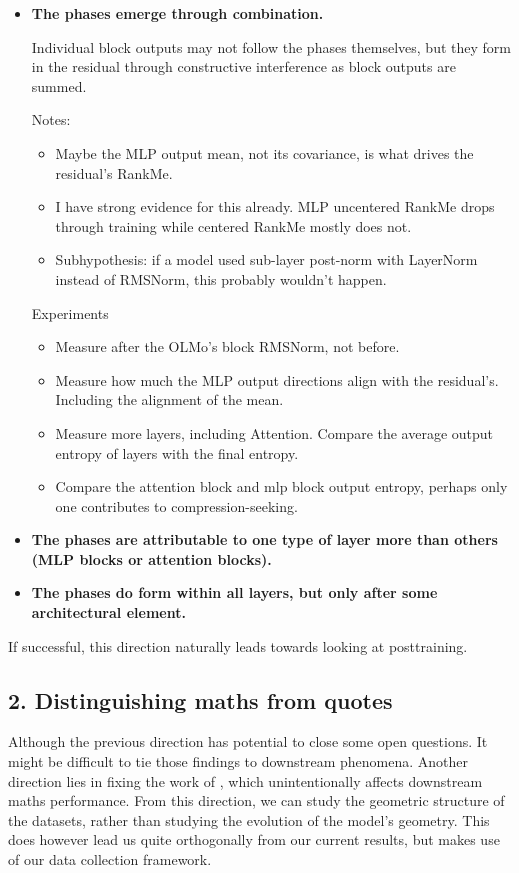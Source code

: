 \documentclass[11pt,a4paper]{article}
\newenvironment{notes}[1][Notes]{%
  \par\vspace{0.2em}#1:%
  \begin{itemize}%
}{%
  \end{itemize}%
}
\newenvironment{experiments}[1][Experiments]{%
  \par\vspace{0.2em}#1\par\vspace{0.1em}%
}{%
  \par%
}
\begin{document}
\begin{itemize}
  \item \textbf{The phases emerge through combination.}

    Individual block outputs may not follow the phases themselves, but they form in the residual through constructive interference as block outputs are summed.
    \begin{notes}
      \item Maybe the MLP output mean, not its covariance, is what drives the residual's RankMe.
      \item I have strong evidence for this already. MLP uncentered RankMe drops through training while centered RankMe mostly does not.
      \item Subhypothesis: if a model used sub-layer post-norm with LayerNorm instead of RMSNorm, this probably wouldn't happen.
    \end{notes}
    \begin{experiments}
    \begin{itemize}
      \item Measure after the OLMo's block RMSNorm, not before.
      \item Measure how much the MLP output directions align with the residual's. Including the alignment of the mean.
      \item Measure more layers, including Attention. Compare the average output entropy of layers with the final entropy.
      \item Compare the attention block and mlp block output entropy, perhaps only one contributes to compression-seeking.
    \end{itemize}
    \end{experiments}
  \item \textbf{The phases are attributable to one type of layer more than others (MLP blocks or attention blocks).}
  \item \textbf{The phases do form within all layers, but only after some architectural element.}
\end{itemize}

If successful, this direction naturally leads towards looking at posttraining.

\subsection{2. Distinguishing maths from quotes}

Although the previous direction has potential to close some open questions. It might be difficult to tie those findings to downstream phenomena. Another direction lies in fixing the work of \citet{merullo2025memorization}, which unintentionally affects downstream maths performance. From this direction, we can study the geometric structure of the datasets, rather than studying the evolution of the model's geometry. This does however lead us quite orthogonally from our current results, but makes use of our data collection framework.
\end{document}
